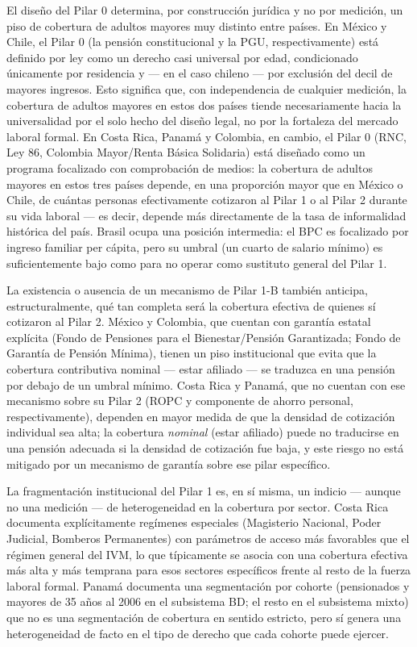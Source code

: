 \documentclass[12pt, letterpaper]{article}
\begin{document}
El diseño del Pilar 0 determina, por construcción jurídica y no por medición, un piso de cobertura de adultos mayores muy distinto entre países. En México y Chile, el Pilar 0 (la pensión constitucional y la PGU, respectivamente) está definido por ley como un derecho casi universal por edad, condicionado únicamente por residencia y --- en el caso chileno --- por exclusión del decil de mayores ingresos. Esto significa que, con independencia de cualquier medición, la cobertura de adultos mayores en estos dos países tiende necesariamente hacia la universalidad por el solo hecho del diseño legal, no por la fortaleza del mercado laboral formal. En Costa Rica, Panamá y Colombia, en cambio, el Pilar 0 (RNC, Ley 86, Colombia Mayor/Renta Básica Solidaria) está diseñado como un programa focalizado con comprobación de medios: la cobertura de adultos mayores en estos tres países depende, en una proporción mayor que en México o Chile, de cuántas personas efectivamente cotizaron al Pilar 1 o al Pilar 2 durante su vida laboral --- es decir, depende más directamente de la tasa de informalidad histórica del país. Brasil ocupa una posición intermedia: el BPC es focalizado por ingreso familiar per cápita, pero su umbral (un cuarto de salario mínimo) es suficientemente bajo como para no operar como sustituto general del Pilar 1.

La existencia o ausencia de un mecanismo de Pilar 1-B también anticipa, estructuralmente, qué tan completa será la cobertura efectiva de quienes sí cotizaron al Pilar 2. México y Colombia, que cuentan con garantía estatal explícita (Fondo de Pensiones para el Bienestar/Pensión Garantizada; Fondo de Garantía de Pensión Mínima), tienen un piso institucional que evita que la cobertura contributiva nominal --- estar afiliado --- se traduzca en una pensión por debajo de un umbral mínimo. Costa Rica y Panamá, que no cuentan con ese mecanismo sobre su Pilar 2 (ROPC y componente de ahorro personal, respectivamente), dependen en mayor medida de que la densidad de cotización individual sea alta; la cobertura \textit{nominal} (estar afiliado) puede no traducirse en una pensión adecuada si la densidad de cotización fue baja, y este riesgo no está mitigado por un mecanismo de garantía sobre ese pilar específico.

La fragmentación institucional del Pilar 1 es, en sí misma, un indicio --- aunque no una medición --- de heterogeneidad en la cobertura por sector. Costa Rica documenta explícitamente regímenes especiales (Magisterio Nacional, Poder Judicial, Bomberos Permanentes) con parámetros de acceso más favorables que el régimen general del IVM, lo que típicamente se asocia con una cobertura efectiva más alta y más temprana para esos sectores específicos frente al resto de la fuerza laboral formal. Panamá documenta una segmentación por cohorte (pensionados y mayores de 35 años al 2006 en el subsistema BD; el resto en el subsistema mixto) que no es una segmentación de cobertura en sentido estricto, pero sí genera una heterogeneidad de facto en el tipo de derecho que cada cohorte puede ejercer.
\end{document}
